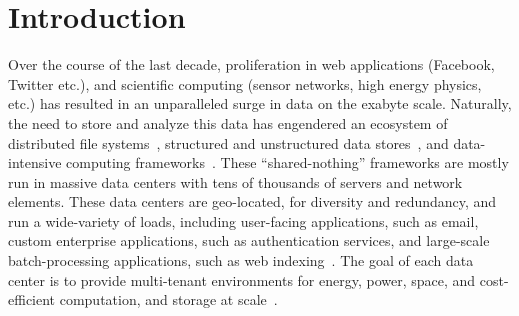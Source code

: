 \documentclass[a4paper,12pt,twoside,openright]{report}
\begin{document}
\pagestyle{empty}
\singlespacing

\onehalfspacing

\singlespacing


\setcounter{page}{0}
\pagestyle{plain}
\tableofcontents
\listoffigures
\listoftables

\onehalfspacing


\chapter{Introduction}
\setcounter{page}{1} 

Over the course of the last decade, proliferation in web applications (Facebook,
Twitter etc.), and scientific computing (sensor networks, high energy physics,
etc.) has resulted in an unparalleled surge in data on the exabyte scale.
Naturally, the need to store and analyze this data has engendered an ecosystem
of distributed file systems~\cite{Ghemawat:2003:GFS}, structured and
unstructured data stores~\cite{Chang:2006:BDS,DeCandia:2007:DAH}, and
data-intensive computing
frameworks~\cite{Dean:2004:MSD,Isard:2007:DDD,Murray:2011:CUE}. These
``shared-nothing'' frameworks are mostly run in massive data centers with tens
of thousands of servers and network elements. These data centers are
geo-located, for diversity and redundancy, and run a wide-variety of loads,
including user-facing applications, such as email, custom enterprise
applications, such as authentication services, and large-scale batch-processing
applications, such as web indexing~\cite{Benson:2010:NTC}. The goal of each data
center is to provide multi-tenant environments for energy, power, space, and
cost-efficient computation, and storage at scale~\cite{Katz:2009:TTB}.
\end{document}
